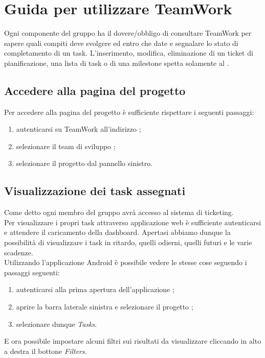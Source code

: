 \section{Guida per utilizzare TeamWork} \label{sec:teamwork}
		Ogni componente del gruppo ha il dovere/obbligo di consultare TeamWork per sapere quali compiti deve svolgere ed entro che date e segnalare lo stato di completamento di un task. L'inserimento, modifica, eliminazione di un ticket di pianificazione, una lista di task o di una milestone spetta solamente al .
		\subsection{Accedere alla pagina del progetto}
			Per accedere alla pagina del progetto è sufficiente rispettare i seguenti passaggi:
			\begin{enumerate}
				\item autenticarsi su TeamWork all'indirizzo ;
				\item selezionare il team di sviluppo \groupname{};
				\item selezionare il progetto \projectname{} dal pannello sinistro.
			\end{enumerate}
			
		\subsection{Visualizzazione dei task assegnati}
			Come detto ogni membro del gruppo \groupname{} avrà accesso al sistema di ticketing.\\
			Per visualizzare i propri task attraverso applicazione web è sufficiente autenticarsi e attendere il caricamento della dashboard. Apertasi abbiamo dunque la possibilità di visualizzare i task in ritardo, quelli odierni, quelli futuri e le varie scadenze.\\
			
Utilizzando l'applicazione Android è possibile vedere le stesse cose seguendo i passaggi seguenti:
			\begin{enumerate}
				\item autenticarsi alla prima apertura dell'applicazione ;
				\item aprire la barra laterale sinistra e selezionare il progetto \projectname{};
				\item selezionare dunque \textit{Tasks}.
			\end{enumerate}
			E ora possibile impostare alcuni filtri sui risultati da visualizzare cliccando in alto a destra il bottone  \textit{Filters}.

